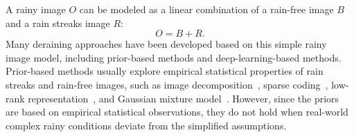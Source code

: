 \documentclass[letterpaper]{article} %
\begin{document}
A rainy image $O$ can be modeled as a linear combination of a rain-free image $B$ and a rain streaks image $R$:
\begin{equation}
O = B + R.
\label{eq:rainy formation}
\end{equation}
Many deraining approaches have been developed based on this simple rainy image model, including prior-based methods and deep-learning-based methods. Prior-based methods usually explore empirical statistical properties of rain streaks and rain-free images, such as image decomposition~\cite{derain_id_kang}, sparse coding~\cite{derain_dsc_luo,derain_zhang_Sparse_and_Low-Rank}, low-rank representation~\cite{derain_lowrank}, and Gaussian mixture model~\cite{derain_lp_li}.
%
However, since the priors are based on empirical statistical observations, they do not hold when real-world complex rainy conditions deviate from the simplified assumptions.
%


\end{document}
